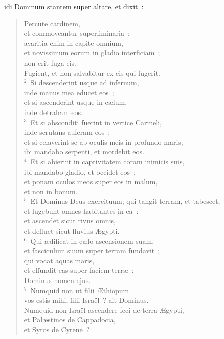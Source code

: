 \bchapter
{}idi Dominum stantem super altare, et dixit~: \begin{flushleft}\begin{verse}\vspace{6pt}Percute cardinem,\\ et commoveantur superliminaria~:\\ avaritia enim in capite omnium,\\ et novissimum eorum in gladio interficiam~;\\ non erit fuga eis.\\ Fugient, et non salvabitur ex eis qui fugerit.\\
${}^{2}$~Si descenderint usque ad infernum,\\ inde manus mea educet eos~;\\ et si ascenderint usque in c\ae lum,\\ inde detraham eos.\\
${}^{3}$~Et si absconditi fuerint in vertice Carmeli,\\ inde scrutans auferam eos~;\\ et si celaverint se ab oculis meis in profundo maris,\\ ibi mandabo serpenti, et mordebit eos.\\
${}^{4}$~Et si abierint in captivitatem coram inimicis suis,\\ ibi mandabo gladio, et occidet eos~:\\ et ponam oculos meos super eos in malum,\\ et non in bonum.\\
${}^{5}$~Et Dominus Deus exercituum, qui tangit terram, et tabescet,\\ et lugebunt omnes habitantes in ea~:\\ et ascendet sicut rivus omnis,\\ et defluet sicut fluvius \AE gypti.\\
${}^{6}$~Qui \ae dificat in c\ae lo ascensionem suam,\\ et fasciculum suum super terram fundavit~;\\ qui vocat aquas maris,\\ et effundit eas super faciem terr\ae~:\\ Dominus nomen ejus.\\
${}^{7}$~Numquid non ut filii \AE thiopum\\ vos estis mihi, filii Isra\"el~? ait Dominus.\\ Numquid non Isra\"el ascendere feci de terra \AE gypti,\\ et Pal\ae stinos de Cappadocia,\\ et Syros de Cyrene~?\end{verse}\end{flushleft}


